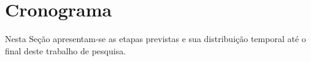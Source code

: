 \section{Cronograma}\label{sec:crono}

Nesta Seção apresentam-se as etapas previstas e sua distribuição temporal até o
final deste trabalho de pesquisa.



